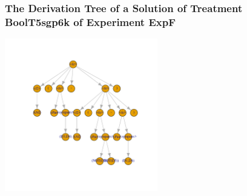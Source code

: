  \begin{frame}
 \frametitle{ The Derivation Tree of a Solution of Treatment BoolT5sgp6k of Experiment ExpF }
 \begin{center}
\includegraphics[width=0.5\textwidth, angle=0]
{ExpFDerivationTreeFigure007.pdf}
 \end{center}
 \label{report/ExpFDerivationTreeFigure007.pdf}  
 \end{frame}

